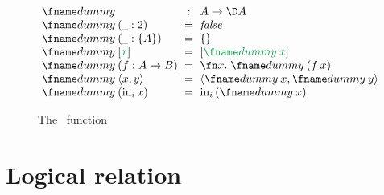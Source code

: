 \documentclass{rntz}\usepackage{fantasy}%
\begin{document}




\begin{figure*}
  \[\setlength\arraycolsep{.3em}\begin{array}{lcl}
    \dummy &:& A \to \D A\\
    \dummy \<(\pwild : \tbool) &=& \efalse\\
    \dummy \<(\pwild : \tset{A}) &=& \eset{}\\
    \dummy \<\eboxd{x} &=& \eboxd{\dummy\<x}\\
    \dummy \<(f : A \to B) &=& \fnof{x} \dummy\<(f\<x)\\
    \dummy \<\etuple{x,y} &=& \etuple{\dummy\<x, \dummy\<y}\\
    \dummy \<(\inj i x) &=& \inj i (\dummy\<x)
  \end{array}\]
  \caption{The \dummy\ function}
  \label{fig:dummy}
\end{figure*}


\section{Logical relation}
\end{document}
